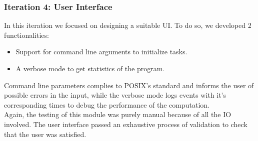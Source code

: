       \subsubsection{Iteration 4: User Interface}

      In this iteration we focused on designing a suitable UI. To do so, we
      developed 2 functionalities:
      \begin{itemize}
        \item Support for command line arguments to initialize tasks.
        \item A verbose mode to get statistics of the program.
      \end{itemize}

      Command line parameters complies to POSIX's standard and informs the
      user of possible errors in the input, while the verbose mode logs events
      with it's corresponding times to debug the performance of the
      computation.\\

      Again, the testing of this module was purely manual because of all
      the IO involved. The user interface passed an exhaustive process of
      validation to check that the user was satisfied.\\
